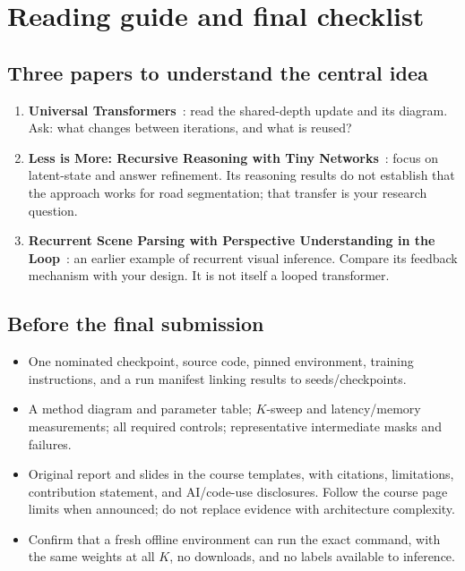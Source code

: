 \documentclass[11pt,letterpaper]{article}
\newcommand{\page}[1]{\clearpage\section{#1}}
\begin{document}
\page{Reading guide and final checklist}
\subsection{Three papers to understand the central idea}
\begin{enumerate}
\item \textbf{Universal Transformers}~\cite{ut}: read the shared-depth update and its diagram. Ask: what changes between iterations, and what is reused?
\item \textbf{Less is More: Recursive Reasoning with Tiny Networks}~\cite{trm}: focus on latent-state and answer refinement. Its reasoning results do not establish that the approach works for road segmentation; that transfer is your research question.
\item \textbf{Recurrent Scene Parsing with Perspective Understanding in the Loop}~\cite{scene}: an earlier example of recurrent visual inference. Compare its feedback mechanism with your design. It is not itself a looped transformer.
\end{enumerate}
\subsection{Before the final submission}
\begin{itemize}
\item One nominated checkpoint, source code, pinned environment, training instructions, and a run manifest linking results to seeds/checkpoints.
\item A method diagram and parameter table; $K$-sweep and latency/memory measurements; all required controls; representative intermediate masks and failures.
\item Original report and slides in the course templates, with citations, limitations, contribution statement, and AI/code-use disclosures. Follow the course page limits when announced; do not replace evidence with architecture complexity.
\item Confirm that a fresh offline environment can run the exact command, with the same weights at all $K$, no downloads, and no labels available to inference.
\end{itemize}
\end{document}
